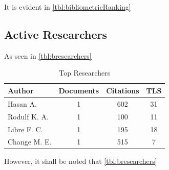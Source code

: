 \documentclass[journal, a4paper]{IEEEtran}
\begin{document}
\begin{table}[htbp]

  \centering
  \caption{Bibliometric Ranking Of Journals}
  \label{tbl:bibliometricRanking}
\end{table}

It is evident in \autoref{tbl:bibliometricRanking} \lipsum[1]


\subsection{Active Researchers}
As seen in \autoref{tbl:bresearchers} \lipsum[1]

\begin{table}[htbp]

  \centering
  \caption{Top Researchers}
  \label{tbl:bresearchers}
  \begin{tabular}{lccc}

      \toprule
      \textbf{Author} & \textbf{Documents} & \textbf{Citations} & \textbf{TLS} \\
      \midrule
      Hasan A.                   & 1     & 602   &  31         \\
      Rodulf K. A.               & 1     & 100   &  11         \\
      Libre F. C.                & 1     & 195   &  18         \\
      Change M. E.               & 1     & 515   &  7          \\
      \bottomrule
  \end{tabular}
\end{table}

However, it shall be noted that \autoref{tbl:bresearchers} \lipsum[1]\lipsum[1]
\end{document}
